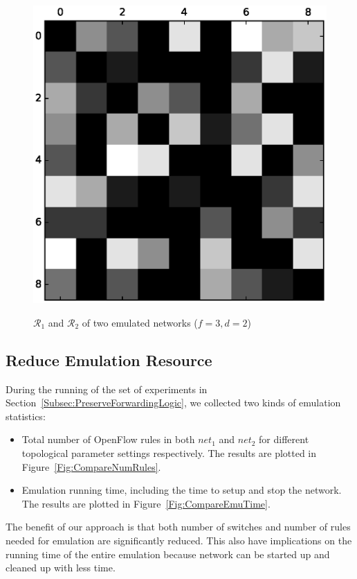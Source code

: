 \begin{figure}[t]
{                \includegraphics[scale=.5]{figures/bs_ping_mat_2_3.eps}
                \label{Fig:PingMatrix2}
        }
        \caption{$\mathcal{R}_1$ and $\mathcal{R}_2$ of two emulated networks ($f=3, d=2$)}
        \label{Fig:TwoPingMatrix}
\end{figure}

\subsection{Reduce Emulation Resource}
During the running of the set of experiments in Section~\ref{Subsec:PreserveForwardingLogic},
we collected two kinds of emulation statistics:
\begin{itemize}
\item Total number of OpenFlow rules in both $net_1$ and $net_2$ for different topological
        parameter settings respectively.
        The results are plotted in Figure~\ref{Fig:CompareNumRules}.
\item Emulation running time, including the time to setup and stop the network.
        The results are plotted in Figure~\ref{Fig:CompareEmuTime}.
\end{itemize}

The benefit of our approach is that both number of switches and number of rules needed
for emulation are significantly reduced.
This also have implications on the running time of the entire emulation
because network can be started up and cleaned up with less time.

